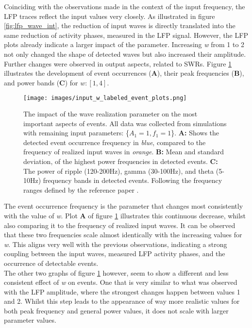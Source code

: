        Coinciding with the observations made in the context of the input frequency, the LFP traces reflect the input values very closely. As illustrated in figure \ref{fig:lfp_wave_int}, the reduction of input waves is directly translated into the same reduction of activity phases, measured in the LFP signal. However, the LFP plots already indicate a larger impact of the parameter. Increasing \textit{w} from 1 to 2 not only changed the shape of detected waves but also increased their amplitude.\\
        Further changes were observed in output aspects, related to SWRs. Figure \ref{fig:input_w_events} illustrates the development of event occurrences (\textbf{A}), their peak frequencies (\textbf{B}), and power bands (\textbf{C}) for \(w: [1, 4]\).
        
        \begin{figure}[htbp]
            \centering
            \texttt{[image: images/input\_w\_labeled\_event\_plots.png]}
            \caption{The impact of the wave realization parameter on the most important aspects of events. All data was collected from simulations with remaining input parameters: \{\(A_1 = 1, f_1 = 1\)\}. \textbf{A:} Shows the detected event occurrence frequency in \textit{blue}, compared to the frequency of realized input waves in \textit{orange}. \textbf{B:} Mean and standard deviation, of the highest power frequencies in detected events. \textbf{C:} The power of ripple (120-200Hz), gamma (30-100Hz), and theta (5-10Hz) frequency bands in detected events. Following the frequency ranges defined by the reference paper \cite{Aussel.2018}.}
            \label{fig:input_w_events}
        \end{figure}
        The event occurrence frequency is the parameter that changes most consistently with the value of \textit{w}. Plot \textbf{A} of figure \ref{fig:input_w_events} illustrates this continuous decrease, whilst also comparing it to the frequency of realized input waves. It can be observed that these two frequencies scale almost identically with the increasing values for \textit{w}. This aligns very well with the previous observations, indicating a strong coupling between the input waves, measured LFP activity phases, and the occurrence of detectable events.\\
        The other two graphs of figure \ref{fig:input_w_events} however, seem to show a different and less consistent effect of \textit{w} on events. One that is very similar to what was observed with the LFP amplitude, where the strongest changes happen between values 1 and 2. Whilst this step leads to the appearance of way more realistic values for both peak frequency and general power values, it does not scale with larger parameter values.\\
